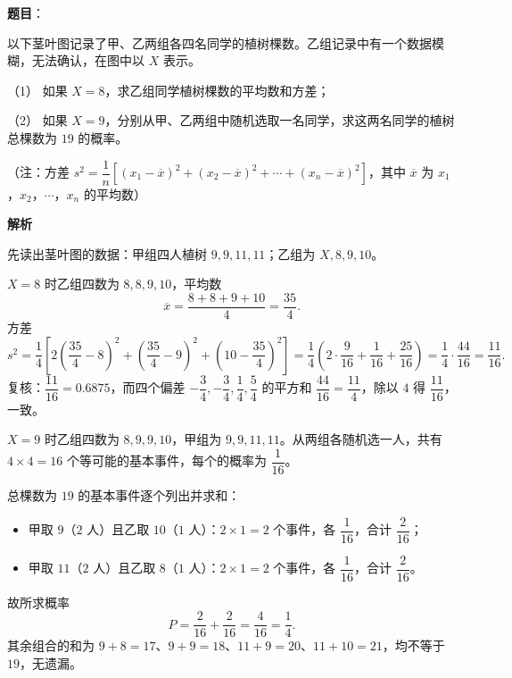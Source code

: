 \begin{answer}

\textbf{题目}：

以下茎叶图记录了甲、乙两组各四名同学的植树棵数。乙组记录中有一个数据模糊，无法确认，在图中以 $X$ 表示。
\nopagebreak[4]
\begin{center}\end{center}
\nopagebreak[4]
（1） 如果 $X=8$，求乙组同学植树棵数的平均数和方差；

（2） 如果 $X=9$，分别从甲、乙两组中随机选取一名同学，求这两名同学的植树总棵数为 $19$ 的概率。

（注：方差 $s^2=\dfrac1n\left[(x_1-\overline x)^2+(x_2-\overline x)^2+\cdots+(x_n-\overline x)^2\right]$，其中 $\overline x$ 为 $x_1$，$x_2$，$\cdots$，$x_n$ 的平均数）

\textbf{解析}

先读出茎叶图的数据：甲组四人植树 $9,9,11,11$；乙组为 $X,8,9,10$。


$X=8$ 时乙组四数为 $8,8,9,10$，平均数
\nopagebreak[4]
\[
\overline x=\frac{8+8+9+10}{4}=\frac{35}{4}.
\]
方差
\nopagebreak[4]
\[
s^2=\frac14\left[2\left(\frac{35}{4}-8\right)^2+\left(\frac{35}{4}-9\right)^2+\left(10-\frac{35}{4}\right)^2\right]
=\frac14\left(2\cdot\frac{9}{16}+\frac{1}{16}+\frac{25}{16}\right)
=\frac{1}{4}\cdot\frac{44}{16}=\frac{11}{16}.
\]
复核：$\dfrac{11}{16}=0.6875$，而四个偏差 $-\dfrac34,-\dfrac34,\dfrac14,\dfrac54$ 的平方和 $\dfrac{44}{16}=\dfrac{11}{4}$，除以 $4$ 得 $\dfrac{11}{16}$，一致。


$X=9$ 时乙组四数为 $8,9,9,10$，甲组为 $9,9,11,11$。从两组各随机选一人，共有 $4\times4=16$ 个等可能的基本事件，每个的概率为 $\dfrac1{16}$。

总棵数为 $19$ 的基本事件逐个列出并求和：

\begin{itemize}
\item 甲取 $9$（$2$ 人）且乙取 $10$（$1$ 人）：$2\times1=2$ 个事件，各 $\dfrac1{16}$，合计 $\dfrac2{16}$；
\item 甲取 $11$（$2$ 人）且乙取 $8$（$1$ 人）：$2\times1=2$ 个事件，各 $\dfrac1{16}$，合计 $\dfrac2{16}$。
\end{itemize}

故所求概率
\nopagebreak[4]
\[
P=\frac{2}{16}+\frac{2}{16}=\frac{4}{16}=\frac14.
\]
其余组合的和为 $9+8=17$、$9+9=18$、$11+9=20$、$11+10=21$，均不等于 $19$，无遗漏。



\end{answer}

